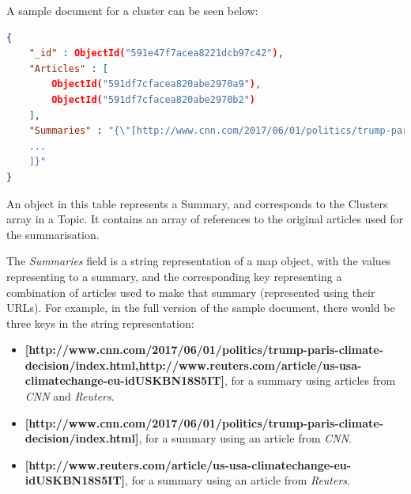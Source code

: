 \documentclass[12pt]{article}
\begin{document}
A sample document for a cluster can be seen below:

\begin{lstlisting}[language=json, firstnumber=1, caption={A sample document in the Summaries table}]
{
    "_id" : ObjectId("591e47f7acea8221dcb97c42"),
    "Articles" : [ 
        ObjectId("591df7cfacea820abe2970a9"), 
        ObjectId("591df7cfacea820abe2970b2")
    ],
    "Summaries" : "{\"[http://www.cnn.com/2017/06/01/politics/trump-paris-climate-decision/index.html,http://www.reuters.com/article/us-usa-climatechange-eu-idUSKBN18S5IT]\":[{\"sentence\":\"BRUSSELS The European Union said on Thursday it had made its position on climate change clear and was not engaged in last-minute lobbying of the Trump administration to keep the United States aboard the Paris climate accord.\",\"sentencePosition\":0.0,\"absoluteSentencePosition\":0,\"identifier\":26,\"relatedNodes\":[],\"source\":\"reuters\"}
    ...
    ]}"
}
\end{lstlisting}

An object in this table represents a Summary, and corresponds to the Clusters array in a Topic. It contains an array of references to the original articles used for the summarisation.

The \emph{Summaries} field is a string representation of a map object, with the values representing to a summary, and the corresponding key representing a combination of articles used to make that summary (represented using their URLs). For example, in the full version of the sample document, there would be three keys in the string representation:

\begin{sloppypar}
\begin{itemize}
	\item \textbf{[http://www.cnn.com/2017/06/01/politics/trump-paris-climate-decision/index.html,http://www.reuters.com/article/us-usa-climatechange-eu-idUSKBN18S5IT]{}}, for a summary using articles from \emph{CNN} and \emph{Reuters}.
	\item \textbf{[http://www.cnn.com/2017/06/01/politics/trump-paris-climate-decision/index.html]}, for a summary using an article from \emph{CNN}.
	\item \textbf{[http://www.reuters.com/article/us-usa-climatechange-eu-idUSKBN18S5IT]}, for a summary using an article from \emph{Reuters}. \\
\end{itemize}
\end{sloppypar}
\end{document}
